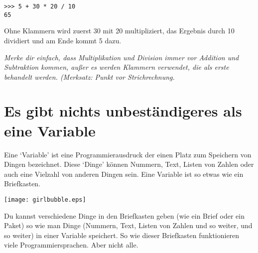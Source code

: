 \begin{Verbatim}[frame=single]
>>> 5 + 30 * 20 / 10
65
\end{Verbatim}

Ohne Klammern wird zuerst 30 mit 20 multipliziert, das Ergebnis durch 10 dividiert und am Ende kommt 5 dazu.

\emph{Merke dir einfach, dass Multiplikation und Division immer vor Addition und Subtraktion kommen, außer es werden Klammern verwendet, die als erste behandelt werden. (Merksatz: Punkt vor Strichrechnung.}

\section{Es gibt nichts unbeständigeres als eine Variable}

Eine `Variable' ist eine Programmierausdruck der einen Platz zum Speichern von Dingen bezeichnet. Diese `Dinge' können Nummern, Text, Listen von Zahlen oder auch eine Vielzahl von anderen Dingen sein. Eine Variable ist so etwas wie ein Briefkasten.

\begin{center}
\texttt{[image: girlbubble.eps]}
\end{center}

Du kannst verschiedene Dinge in den Briefkasten geben (wie ein Brief oder ein Paket) so wie man Dinge (Nummern, Text, Listen von Zahlen und so weiter, und so weiter) in einer Variable speichert. So wie dieser Briefkasten funktionieren viele Programmiersprachen. Aber nicht alle.

